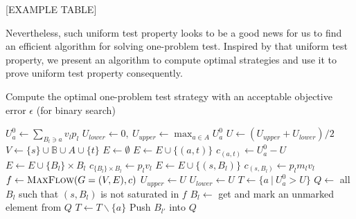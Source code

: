 \documentclass{article}
\begin{document}
[EXAMPLE TABLE]

Nevertheless, such uniform test property looks to be a good news for us to find
an efficient algorithm for solving one-problem test. Inspired by that
uniform test property, we present an algorithm to compute optimal strategies
and use it to prove uniform test property consequently.

\begin{algorithm}\label{alg:one-problem}
\caption{Compute the optimal one-problem test strategy with an acceptable
objective error $\epsilon$ (for binary search)}
\begin{algorithmic}[1]
	 
		\State $U^0_a \gets \sum_{B_l \ni a} v_l p_l$ 
	\EndFor
	\State $U_{lower} \gets 0, ~U_{upper} \gets \max_{a \in A} U^0_a$
		\State $U \gets (U_{upper}+U_{lower})/2$ 
		\State $V \gets \{s\} \cup \mathbb B \cup A \cup \{t\}$ 
		\State $E \gets \emptyset$ 
				\State $E \gets E \cup \{(a, t)\}$
				\State $c_{(a, t)} \gets U^0_a-U$ 
			\EndIf
		\EndFor
			\State $E \gets E \cup \{B_l\} \times B_l$ %
			\State $c_{\{B_l\} \times B_l} \gets p_l v_l$ 
			\State $E \gets E \cup \{(s, B_l)\}$ %
			\State $c_{(s, B_l)} \gets p_l m_l v_l$
		\EndFor
		\State $f \gets \Call{MaxFlow}{G = (V, E), c}$
			\State $U_{upper} \gets U$
		\Else
			\State $U_{lower} \gets U$
		\EndIf
	\EndWhile
	\State $T \gets \{a ~|~ U^0_a > U\}$
	\State $Q \gets $ all $B_l$ such that $(s, B_l)$ is not saturated in $f$
		\State $B_l \gets $ get and mark an unmarked element from $Q$
			\State $T \gets T \backslash \{a\}$
				\State Push $B_{l'}$ into $Q$
			\EndFor
		\EndFor
	\EndWhile
	\State {}
\EndFunction
\end{algorithmic}
\end{algorithm}
\end{document}
